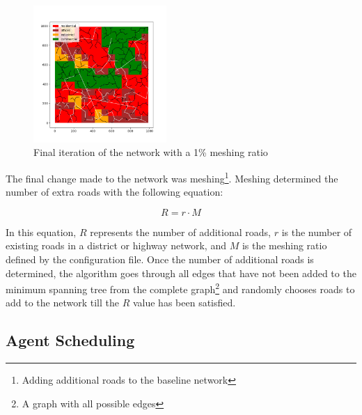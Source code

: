 \documentclass[11pt]{article}
\begin{document}
\begin{multicols}{2}
    \begin{figure}[H]
        \centering
        \includegraphics[width=0.45\textwidth]{images/meshednetwork.png}
        \caption{Final iteration of the network with a 1\% meshing ratio}
        \label{fig:final-meshed-network}
    \end{figure}

    \quad The final change made to the network was meshing\footnote{Adding additional roads to the baseline network}. Meshing determined the number of extra roads with the following equation:

    \[R = r \cdot M\]

    In this equation, $R$ represents the number of additional roads, $r$ is the number of existing roads in a district or highway network, and $M$ is the meshing ratio defined by the configuration file. Once the number of additional roads is determined, the algorithm goes through all edges that have not been added to the minimum spanning tree from the complete graph\footnote{A graph with all possible edges} and randomly chooses roads to add to the network till the $R$ value has been satisfied. 

    \subsection{Agent Scheduling}


\end{multicols}
\end{document}
